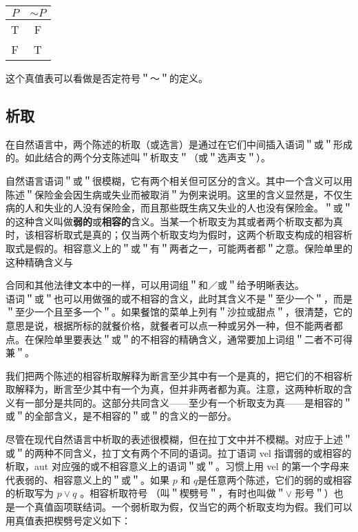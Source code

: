 \begin{center}
\begin{tabular}{|cc|}
\hline
$P$ & $\sim P$ \\
\hline
T & F \\
F & T \\
\hline
\end{tabular}
\end{center}

这个真值表可以看做是否定符号＂～＂的定义。

\subsection{析取}
在自然语言中，两个陈述的析取（或选言）是通过在它们中间插入语词＂或＂形成的。如此结合的两个分支陈述叫＂析取支＂（或＂选声支＂）。

自然语言语词＂或＂很模糊，它有两个相关但可区分的含义。其中一个含义可以用陈述＂保险金会因生病或失业而被取消＂为例来说明。这里的含义显然是，不仅生病的人和失业的人没有保险金，而且那些既生病又失业的人也没有保险金。＂或＂的这种含义叫做\textbf{弱的}或\textbf{相容的}含义。当某一个析取支为其或者两个析取支都为真时，该相容析取式是真的；仅当两个析取支均为假时，这两个析取支构成的相容析取式是假的。相容意义上的＂或＂有＂两者之一，可能两者都＂之意。保险单里的这种精确含义与

合同和其他法律文本中的一样，可以用词组＂和／或＂给予明晰表达。\\
语词＂或＂也可以用做强的或不相容的含义，此时其含义不是＂至少一个＂，而是＂至少一个且至多一个＂。如果餐馆的菜单上列有＂沙拉或甜点＂，很清楚，它的意思是说，根据所标的就餐价格，就餐者可以点一种或另外一种，但不能两者都点。在保险单里要表达＂或＂的不相容的精确含义，通常要加上词组＂二者不可得兼＂。

我们把两个陈述的相容析取解释为断言至少其中有一个是真的，把它们的不相容析取解释为，断言至少其中有一个为真，但并非两者都为真。注意，这两种析取的含义有一部分是共同的。这部分共同含义——至少有一个析取支为真——是相容的＂或＂的全部含义，是不相容的＂或＂的含义的一部分。

尽管在现代自然语言中析取的表述很模糊，但在拉丁文中并不模糊。对应于上述＂或＂的两种不同含义，拉丁文有两个不同的语词。拉丁语词 vel 指谓弱的或相容的析取，aut 对应强的或不相容意义上的语词＂或＂。习惯上用 vel 的第一个字母来代表弱的、相容意义上的＂或＂。如果 $p$ 和 $q$是任意两个陈述，它们的弱的或相容的析取写为 $p \vee q$ 。相容析取符号 （叫＂楔劈号＂，有时也叫做＂$\vee$ 形号＂）也是一个真值函项联结词。一个弱析取为假，仅当它的两个析取支均为假。我们可以用真值表把楔劈号定义如下：

